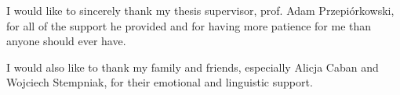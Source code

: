 I would like to sincerely thank my thesis supervisor, prof. Adam Przepiórkowski, for all of the support he provided and for having more patience for me than anyone should ever have.

I would also like to thank my family and friends, especially Alicja Caban and Wojciech Stempniak, for their emotional and linguistic support. 